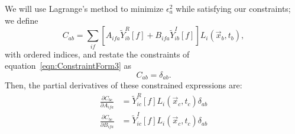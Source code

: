 We will use Lagrange's method to minimize $\epsilon^2_a$ while satisfying our constraints; we define
\begin{equation}
C_{ab} = \sum_{if}\left[A_{ifa} \widetilde{Y}_{ib}^R[f] + B_{ifa} \widetilde{Y}_{ib}^I[f]\right] L_i(\vec{x}_b,t_b),
\end{equation}
with ordered indices, and restate the constraints of equation~\ref{eqn:ConstraintForm3} as
\begin{equation}
C_{ab} = \delta_{ab}.
\end{equation}
Then, the partial derivatives of these constrained expressions are:
\begin{subequations}\begin{align}
\frac{\partial C_{bc}}{\partial A_{ifa}} &= \widetilde{Y}^R_{ic}[f] L_i(\vec{x}_c,t_c) \delta_{ab} \\
\frac{\partial C_{bc}}{\partial B_{ifa}} &= \widetilde{Y}^I_{ic}[f] L_i(\vec{x}_c,t_c) \delta_{ab}
\end{align}\end{subequations}

